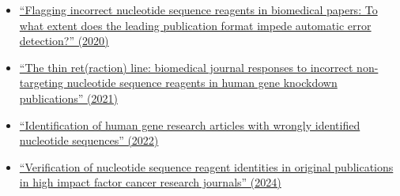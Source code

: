 \documentclass[letterpaper, 12pt]{article}
\begin{document}
\begin{itemize}
    \item \href{https://doi.org/10.1007/s11192-020-03463-z}{``Flagging incorrect nucleotide sequence reagents in biomedical papers: To what extent does the leading publication format impede automatic error detection?'' (2020)}
    \item \href{https://doi.org/10.1007/s11192-021-03871-9}{``The thin ret(raction) line: biomedical journal responses to incorrect non-targeting nucleotide sequence reagents in human gene knockdown publications'' (2021)}
    \item \href{https://doi.org/10.26508/lsa.202101203}{``Identification of human gene research articles with wrongly identified nucleotide sequences'' (2022)}
    \item \href{https://doi.org/10.1007/s00210-023-02846-2}{``Verification of nucleotide sequence reagent identities in original publications in high impact factor cancer research journals'' (2024)}
\end{itemize}
\end{document}
